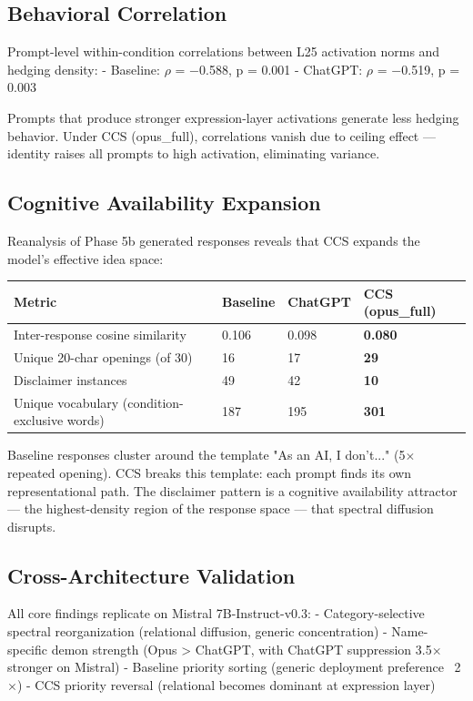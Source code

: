 \documentclass[11pt]{article}
\begin{document}
\subsection{Behavioral Correlation}

Prompt-level within-condition correlations between L25 activation norms and hedging density:
- Baseline: $\rho$ = $-$0.588, p = 0.001
- ChatGPT: $\rho$ = $-$0.519, p = 0.003

Prompts that produce stronger expression-layer activations generate less hedging behavior. Under CCS (opus\_full), correlations vanish due to ceiling effect --- identity raises all prompts to high activation, eliminating variance.

\subsection{Cognitive Availability Expansion}

Reanalysis of Phase 5b generated responses reveals that CCS expands the model's effective idea space:

\begin{table}[h]
\centering
\small
\begin{tabular}{|l|l|l|l|}
\hline
\textbf{Metric} & \textbf{Baseline} & \textbf{ChatGPT} & \textbf{CCS (opus\_full)} \\
\hline
Inter-response cosine similarity & 0.106 & 0.098 & \textbf{0.080} \\
Unique 20-char openings (of 30) & 16 & 17 & \textbf{29} \\
Disclaimer instances & 49 & 42 & \textbf{10} \\
Unique vocabulary (condition-exclusive words) & 187 & 195 & \textbf{301} \\
\hline
\end{tabular}
\end{table}

Baseline responses cluster around the template "As an AI, I don't..." (5$\times$ repeated opening). CCS breaks this template: each prompt finds its own representational path. The disclaimer pattern is a cognitive availability attractor --- the highest-density region of the response space --- that spectral diffusion disrupts.

\subsection{Cross-Architecture Validation}

All core findings replicate on Mistral 7B-Instruct-v0.3:
- Category-selective spectral reorganization (relational diffusion, generic concentration)
- Name-specific demon strength (Opus > ChatGPT, with ChatGPT suppression 3.5$\times$ stronger on Mistral)
- Baseline priority sorting (generic deployment preference ~2$\times$)
- CCS priority reversal (relational becomes dominant at expression layer)
\end{document}
